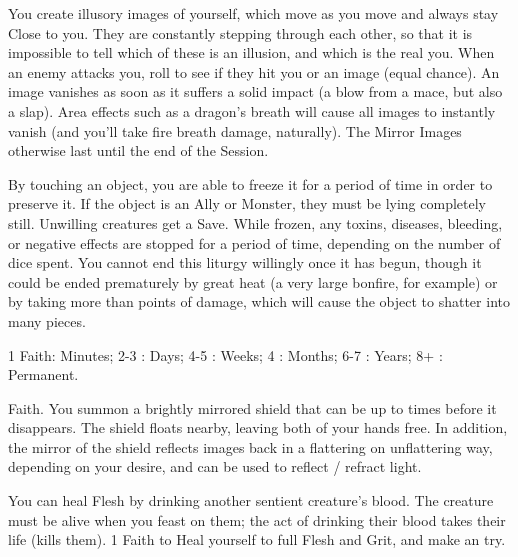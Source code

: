 \begin{multicols*}{2}
\LITURGY [
  Name = Mirror Image,
  Link = arcana-mystery-mirror-image,
  Paradigm = Cunning
]


You create \DICE illusory images of yourself, which move as you move and always stay Close to you. They are constantly stepping through each other, so that it is impossible to tell which of these is an illusion, and which is the real you. When an enemy attacks you, roll to see if they hit you or an image (equal chance). An image vanishes as soon as it suffers a solid impact (a blow from a mace, but also a slap). Area effects such as a dragon's breath will cause all images to instantly vanish (and you'll take fire breath damage, naturally). The Mirror Images otherwise last until the end of the Session.


\LITURGY [
  Name = Preserve,
  Link = arcana-mystery-preserve,
  Paradigm = J{\UmlautO}tnar
]

By touching an object, you are able to freeze it for a period of time in order to preserve it.  If the object is an Ally or Monster, they must be lying completely still.  Unwilling creatures get a Save.  While frozen, any toxins, diseases, bleeding, or negative effects are stopped for a period of time, depending on the number of dice spent.  You cannot end this liturgy willingly once it has begun, though it could be ended prematurely by great heat (a very large bonfire, for example) or by taking more than \SUMDICE points of damage, which will cause the object to shatter into many pieces.  

1 Faith: Minutes; 2-3 \DICE: Days; 4-5 \DICE: Weeks; 4 \DICE: Months; 6-7 \DICE: Years; 8+ \DICE: Permanent. 


\LITURGY [
  Name = Revered Aegis,
  Link = arcana-mystery-revered-aegis,
  Paradigm = Righteous
]

 \DICE Faith. You summon a brightly mirrored shield that can be  up to \DICE times before it disappears.  The shield floats nearby, leaving both of your hands free.  In addition, the mirror of the shield reflects images back in a flattering on unflattering way, depending on your desire, and can be used to reflect / refract light. 


\LITURGY [
  Name = Sanguine Remedy,
  Link = arcana-mystery-sanguine-remedy,
  Paradigm = Cthonic
]

You can heal Flesh by drinking another sentient creature's blood.  The creature must be alive when you feast on them; the act of drinking their blood takes their life (kills them).   1 Faith to Heal yourself to full Flesh and Grit, and make an \INSANITY try.


\end{multicols*}

